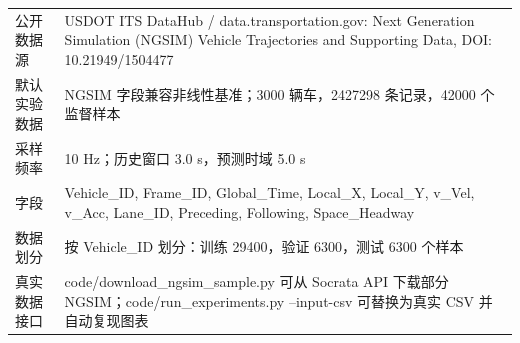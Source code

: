 \begin{tabularx}{\textwidth}{lX}
\toprule
公开数据源 & USDOT ITS DataHub / data.transportation.gov: Next Generation Simulation (NGSIM) Vehicle Trajectories and Supporting Data, DOI: 10.21949/1504477 \\ 
默认实验数据 & NGSIM 字段兼容非线性基准；3000 辆车，2427298 条记录，42000 个监督样本 \\ 
采样频率 & 10 Hz；历史窗口 3.0 s，预测时域 5.0 s \\ 
字段 & Vehicle\_ID, Frame\_ID, Global\_Time, Local\_X, Local\_Y, v\_Vel, v\_Acc, Lane\_ID, Preceding, Following, Space\_Headway \\ 
数据划分 & 按 Vehicle\_ID 划分：训练 29400，验证 6300，测试 6300 个样本 \\ 
真实数据接口 & code/download\_ngsim\_sample.py 可从 Socrata API 下载部分 NGSIM；code/run\_experiments.py --input-csv 可替换为真实 CSV 并自动复现图表 \\ 
\bottomrule
\end{tabularx}
